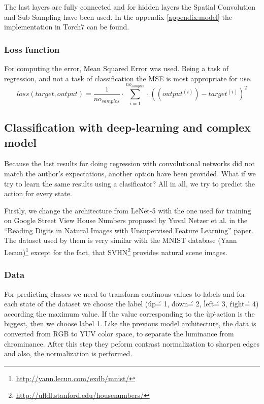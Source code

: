 The last layers are fully connected and for hidden layers the Spatial Convolution and Sub Sampling have been used. In the appendix \ref{appendix:model} the implementation in Torch7 can be found.

\subsubsection{Loss function}
For computing the error, Mean Squared Error was used. Being a task of regression, and not a task of classification the MSE is most appropriate for use.
\begin{equation}
loss(target,output) = \frac{1}{no_{samples}}\cdot\displaystyle\sum_{i=1}^{no_{samples}}\cdot((output^{(i)}) - target^{(i)})^2
\end{equation}


\subsection{Classification with deep-learning and complex model}

Because the last results for doing regression with convolutional networks did not match the author's expectations, another option have been provided. What if we try to learn the same results using a clasificator? All in all, we try to predict the action for every state.

Firstly, we change the architecture from LeNet-5 with the one used for training on Google Street View House Numbers proposed by Yuval Netzer et al. in the ``Reading Digits in Natural Images with Unsupervised Feature Learning''\cite{svhn} paper. The dataset used by them is very similar with the MNIST database (Yann Lecun)\footnote{\url{http://yann.lecun.com/exdb/mnist/}} except for the fact, that SVHN\footnote{\url{http://ufldl.stanford.edu/housenumbers/}} provides natural scene images.

\subsubsection{Data}
For predicting classes we need to transform continous values to labels and for each state of the dataset we choose the label (\'up\' = 1, \'down\' = 2, \'left\' = 3, \'right\' = 4) according the maximum value. If the value corresponding to the \`up\`-action is the biggest, then we choose label 1.
Like the previous model architecture, the data is converted from RGB to YUV color space, to separate the luminance from chrominance. After this step they peform contrast normalization to sharpen edges and also, the normalization is performed.

